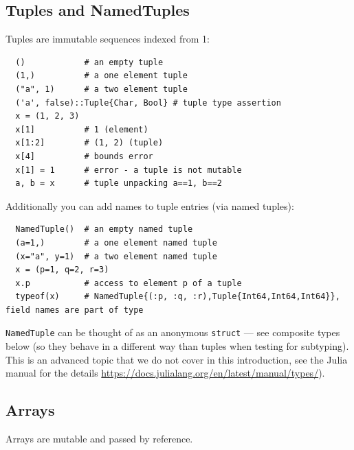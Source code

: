 \documentclass[10pt,a4paper]{article}
\begin{document}
\subsection{Tuples and NamedTuples}
Tuples are immutable sequences indexed from 1:
\begin{lstlisting}
  ()            # an empty tuple
  (1,)          # a one element tuple
  ("a", 1)      # a two element tuple
  ('a', false)::Tuple{Char, Bool} # tuple type assertion
  x = (1, 2, 3)
  x[1]          # 1 (element)
  x[1:2]        # (1, 2) (tuple)
  x[4]          # bounds error
  x[1] = 1      # error - a tuple is not mutable
  a, b = x      # tuple unpacking a==1, b==2
\end{lstlisting}
Additionally you can add names to tuple entries (via named tuples):
\begin{lstlisting}
  NamedTuple()  # an empty named tuple
  (a=1,)        # a one element named tuple
  (x="a", y=1)  # a two element named tuple
  x = (p=1, q=2, r=3)
  x.p           # access to element p of a tuple
  typeof(x)     # NamedTuple{(:p, :q, :r),Tuple{Int64,Int64,Int64}}, field names are part of type
\end{lstlisting}
\lstinline|NamedTuple| can be thought of as an anonymous \lstinline|struct| ---
see composite types below (so they behave in a different way than tuples when
testing for subtyping). This is an advanced topic that we do not cover in this
introduction, see the Julia manual for the details
\url{https://docs.julialang.org/en/latest/manual/types/}).

\subsection{Arrays}
Arrays are mutable and passed by reference.
\end{document}
